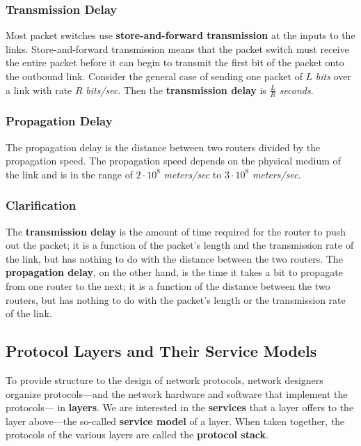 \documentclass[11pt]{article}
\begin{document}
\subsubsection{Transmission Delay}

Most packet switches use \textbf{store-and-forward transmission} at the inputs to the links. Store-and-forward transmission means that the packet switch must receive the entire packet before it can begin to transmit the first bit of the packet onto the outbound link. Consider the general case of sending one packet of $L$ \textit{bits} over a link with rate $R$ \textit{bits/sec}. Then the \textbf{transmission delay} is $\frac{L} {R}$ \textit{seconds}.

\subsubsection{Propagation Delay}

The propagation delay is the distance between two routers divided by the propagation speed. The propagation speed depends on the physical medium of the link and is in the range of $2 \cdot 10^8$ \textit{meters/sec} to $3 \cdot 10^8$ \textit{meters/sec}.

\subsubsection{Clarification}

The \textbf{transmission delay} is the amount of time required for the router to push out the packet; it is a function of the packet’s length and the transmission rate of the link, but has nothing to do with the distance between the two routers. The \textbf{propagation delay}, on the other hand, is the time it takes a bit to propagate from one router to the next; it is a function of the distance between the two routers, but has nothing to do with the packet’s length or the transmission rate of the link.

\subsection{Protocol Layers and Their Service Models}

To provide structure to the design of network protocols, network designers organize protocols—and the network hardware and software that implement the protocols— in \textbf{layers}. We are interested in the \textbf{services} that a layer offers to the layer above—the so-called \textbf{service model} of a layer. When taken together, the protocols of the various layers are called the \textbf{protocol stack}.
\end{document}
